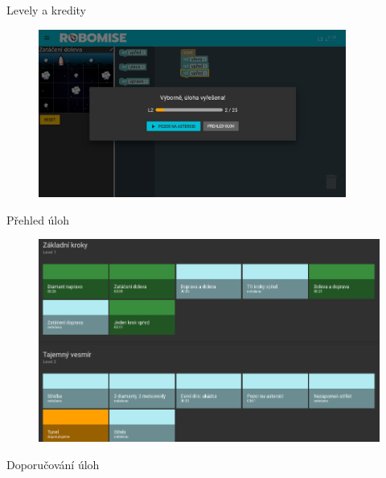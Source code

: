 \documentclass[
]{beamer}
\begin{document}
\begin{frame}{Levely a kredity}
\begin{figure}
\includegraphics[width=0.9\textwidth,height=.75\textheight,keepaspectratio]{../img/robomission-levels-credits}
\end{figure}
\end{frame}

\begin{frame}{Přehled úloh}
\begin{figure}
\includegraphics[width=\textwidth,height=.75\textheight,keepaspectratio]{../img/robomission-tasks-overview}
\end{figure}
\end{frame}

\begin{frame}{Doporučování úloh}
\begin{figure}
\end{figure}
\end{frame}
\end{document}
